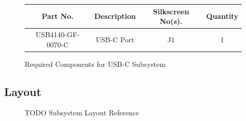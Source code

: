 \documentclass{article}
\begin{document}
\begin{figure}[H]
    \begin{center}
        \begin{tabular}{ c|c|c|c } 
            \textbf{Part No.} & \textbf{Description} & \textbf{Silkscreen No(s).} & \textbf{Quantity} \\ 
            \hline
            USB4140-GF-0070-C & USB-C Port & J1 & 1 \\ 
        \end{tabular}
    \end{center}
    \caption{Required Components for USB-C Subsystem}
    \label{tbl:TODO-materials}
\end{figure}

\subsection{Layout}

\begin{figure}[H]
    \centering
        \qquad
        \caption{TODO Subsystem Layout Reference}%
    \label{fig:TODO-layout}%
\end{figure}
\end{document}
